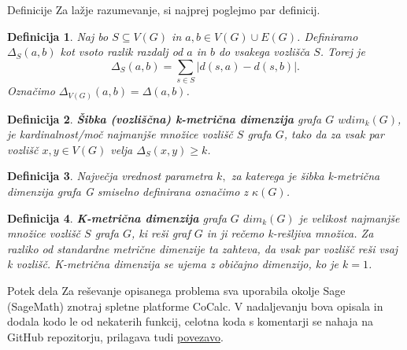 \documentclass[12pt,a4paper]{amsart}
\makeatletter
\renewcommand\section{\@startsection{section}{1}%
  \z@{.5\linespacing\@plus.7\linespacing}{.5\linespacing}%
  {\normalfont\scshape\large\centering}}
\theoremstyle{plain} %
\newtheorem{definition}{Definicija}[section]
\makeatother
\begin{document}
\section{Definicije}
Za lažje razumevanje, si najprej poglejmo par definicij.
\begin{definition}
    Naj bo $S \subseteq V(G)$ in $a, b \in V(G) \cup E(G)$. Definiramo $\Delta_S (a,b)$ kot vsoto razlik razdalj od $a$ in $b$ do vsakega vozlišča $S$. 
    Torej je $$\Delta_S (a,b) = \sum_{s \in S } |d(s,a) - d(s,b)|.$$
    Označimo $\Delta_{V(G)} (a,b) = \Delta (a,b)$.
\end{definition}

\begin{definition} 
    {\bf Šibka (vozliščna) k-metrična dimenzija} grafa $G$ $wdim_k(G)$, je kardinalnost/moč
    najmanjše množice vozlišč $S$ grafa $G$, tako da za vsak par vozlišč $x,y \in V(G)$ velja $\Delta_S (x,y) \geq k$.
\end{definition}

\begin{definition}
    Največja vrednost parametra $k,$ za katerega je šibka k-metrična dimenzija grafa G smiselno definirana označimo z $\kappa(G)$. 
\end{definition}

\begin{definition}
    {\bf K-metrična dimenzija} grafa $G$ $dim_k(G)$ je velikost najmanjše množice vozlišč $S$ grafa $G$, ki reši graf $G$ in ji rečemo k-rešljiva množica. 
    Za razliko od standardne metrične dimenzije ta zahteva, da vsak par vozlišč reši vsaj k vozlišč. K-metrična dimenzija se ujema z običajno dimenzijo, ko je $k = 1$.
\end{definition}
\bigskip
\section{Potek dela}
Za reševanje opisanega problema sva uporabila okolje Sage (SageMath) znotraj spletne platforme CoCalc. 
V nadaljevanju bova opisala in dodala kodo le od nekaterih funkcij, celotna koda s komentarji
se nahaja na GitHub repozitorju, prilagava tudi \href{https://github.com/mihajan/Weak-k-Metric-Dimension}{povezavo}.
\bigskip
\end{document}
